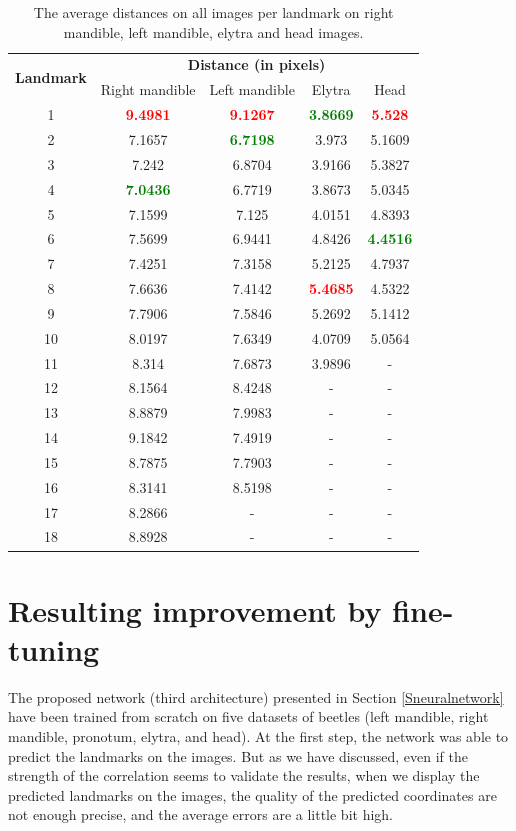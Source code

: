 \documentclass[review]{elsarticle}
\begin{document}
\begin{table}[htbp]
	\centering	
	\begin{tabular}{|c|c|c|c|c|}
		\hline
		\multirow{2}{*}{\textbf{Landmark}} & \multicolumn{4}{|c|}{\textbf{Distance (in pixels)}} \\ \cline{2-5}
		 & Right mandible & Left mandible & Elytra & Head  \\ \hline
		1 & \textcolor{red}{\textbf{9.4981}} & \textcolor{red}{\textbf{9.1267}} & \textcolor{green}{\textbf{3.8669}} & \textcolor{red}{\textbf{5.528}}  \\ \hline
2 & 7.1657 & \textcolor{green}{\textbf{6.7198}} & 3.973 & 5.1609  \\ \hline
3 & 7.242 & 6.8704 & 3.9166 & 5.3827 \\ \hline
4 & \textcolor{green}{\textbf{7.0436}} & 6.7719 & 3.8673 & 5.0345 \\ \hline
5 & 7.1599 & 7.125 & 4.0151 & 4.8393 \\ \hline
6 & 7.5699 & 6.9441 & 4.8426 & \textcolor{green}{\textbf{4.4516}} \\ \hline
7 & 7.4251 & 7.3158 & 5.2125 & 4.7937 \\ \hline
8 & 7.6636 & 7.4142 & \textcolor{red}{\textbf{5.4685}} & 4.5322 \\ \hline
9 & 7.7906 & 7.5846 & 5.2692 & 5.1412 \\ \hline
10 & 8.0197 & 7.6349 & 4.0709 & 5.0564 \\ \hline
11 & 8.314 & 7.6873 & 3.9896 & - \\ \hline
12 & 8.1564 & 8.4248 & - & - \\ \hline
13 & 8.8879 & 7.9983 & - & - \\ \hline
14 & 9.1842 & 7.4919 & - & - \\ \hline
15 & 8.7875 & 7.7903 & - & - \\ \hline
16 & 8.3141 & 8.5198 & - & - \\ \hline
17 & 8.2866 & - & - & - \\ \hline
18 & 8.8928 & - & - & - \\ \hline
	\end{tabular}
	\caption{The average distances on all images per landmark on right mandible, left mandible, elytra and head images.}
	\label{tblavg4parts}
\end{table}

\section{Resulting improvement by fine-tuning}
\label{sfineTuning}
The proposed network (third architecture) presented in Section \ref{Sneuralnetwork} have been trained from scratch on five datasets of beetles (left mandible, right mandible, pronotum, elytra, and head). At the first step, the network was able to predict the landmarks on the images. But as we have discussed, even if the strength of the correlation seems to validate the results, when we display the predicted landmarks on the images, the quality of the predicted coordinates are not enough precise, and the average errors are a little bit high.
\end{document}
